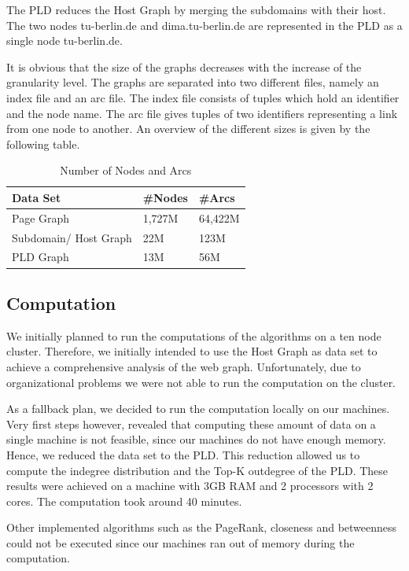 The PLD reduces the Host Graph by merging the subdomains with their host. The two nodes tu-berlin.de and dima.tu-berlin.de are represented in the PLD as a single node tu-berlin.de.

It is obvious that the size of the graphs decreases with the increase of the granularity level. The graphs are separated into two different files, namely an index file and an arc file. The index file consists of tuples which hold an identifier and the node name. The arc file gives tuples of two identifiers representing a link from one node to another. An overview of the different sizes is given by the following table.

\begin{table}[H]
	\caption{Number of Nodes and Arcs}
	\label{t2}
	\begin{center}
		\begin{tabular}{|l|l|l|}
			\hline
			Data Set	&\#Nodes	&\#Arcs \\ \hline
			Page Graph	&1,727M	&64,422M	\\	\hline
			Subdomain/ Host Graph	&22M	&123M	\\	\hline		
			PLD Graph	&13M	&56M	\\	\hline				
		\end{tabular}
	\end{center}
\end{table}

\subsection{Computation}
We initially planned to run the computations of the algorithms on a ten node cluster. Therefore, we initially intended to use the Host Graph as data set to achieve a comprehensive  analysis of the web graph. Unfortunately, due to organizational problems we were not able to run the computation on the cluster.

As a fallback plan, we decided to run the computation locally on our machines. Very first steps however, revealed that computing these amount of data on a single machine is not feasible, since our machines do not have enough memory. Hence, we reduced the data set to the PLD. This reduction allowed us to compute the indegree distribution and the Top-K outdegree of the PLD. These results were achieved on a machine with 3GB RAM and 2 processors with 2 cores. The computation took around 40 minutes. 

Other implemented algorithms such as the PageRank, closeness and betweenness could not be executed since our machines ran out of memory during the computation.

